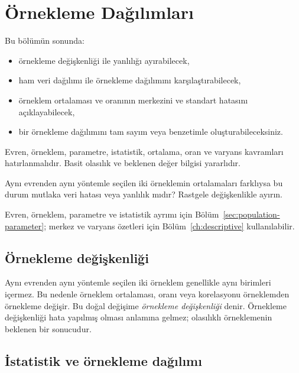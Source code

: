 \chapter{Örnekleme Dağılımları}
\label{ch:sampling-distributions}

\begin{hedefler}
Bu bölümün sonunda:
\begin{itemize}
  \item örnekleme değişkenliği ile yanlılığı ayırabilecek,
  \item ham veri dağılımı ile örnekleme dağılımını karşılaştırabilecek,
  \item örneklem ortalaması ve oranının merkezini ve standart hatasını açıklayabilecek,
  \item bir örnekleme dağılımını tam sayım veya benzetimle oluşturabileceksiniz.
\end{itemize}
\end{hedefler}

\begin{prerequisitebox}
Evren, örneklem, parametre, istatistik, ortalama, oran ve varyans kavramları
hatırlanmalıdır. Basit olasılık ve beklenen değer bilgisi yararlıdır.
\end{prerequisitebox}

\begin{hazirlik}
Aynı evrenden aynı yöntemle seçilen iki örneklemin ortalamaları farklıysa bu
durum mutlaka veri hatası veya yanlılık mıdır? Rastgele değişkenlikle ayırın.
\end{hazirlik}

Evren, örneklem, parametre ve istatistik ayrımı için
Bölüm~\ref{sec:population-parameter}; merkez ve varyans özetleri için
Bölüm~\ref{ch:descriptive} kullanılabilir.

\section{Örnekleme değişkenliği}

Aynı evrenden aynı yöntemle seçilen iki örneklem genellikle aynı birimleri
içermez. Bu nedenle örneklem ortalaması, oranı veya korelasyonu örneklemden
örnekleme değişir. Bu doğal değişime \emph{örnekleme değişkenliği} denir.
Örnekleme değişkenliği hata yapılmış olması anlamına gelmez; olasılıklı
örneklemenin beklenen bir sonucudur.

\section{İstatistik ve örnekleme dağılımı}
\label{sec:sampling-distribution}

